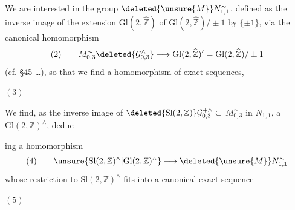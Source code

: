 We are interested in the group $\deleted{\unsure{M}}N_{1,1}^{\sim}$, defined  as the inverse image of the extension $\mathrm{Gl}(2,\widehat{\mathbb Z})$ of $\mathrm{Gl}(2,\widehat{\mathbb Z})/\pm1$ by $\{\pm1\}$, via the canonical homomorphism
\[
(2)\qquad
M_{0,3}^{\sim}\deleted{\mathcal G_{0,3}^{\wedge}}
\longrightarrow\mathrm{Gl}(2,\widehat{\mathbb Z})'
=\mathrm{Gl}(2,\widehat{\mathbb Z})/\pm1
\]
(cf. \S45 \ldots), so that we find a homomorphism of exact sequences,


\begin{samepage}
$(3)$
\end{samepage}

We find,   as the inverse image of $\deleted{\mathrm{Sl}(2,\mathbb Z)}\mathcal G_{0,3}^{+\wedge}\subset$  $M_{0,3}^{\sim}$ in $N_{1,1}$, a $\mathrm{Gl}(2,\mathbb Z)^\wedge$, deduc-



ing a homomorphism
\[
(4)\qquad
\unsure{\mathrm{Sl}(2,\mathbb Z)^\wedge|\mathrm{Gl}(2,\mathbb Z)^\wedge}
\longrightarrow\deleted{\unsure{M}}N_{1,1}^{\sim}
\]
whose restriction to $\mathrm{Sl}(2,\mathbb Z)^\wedge$ fits  into a canonical exact sequence

\begin{samepage}
$(5)$
\end{samepage}

